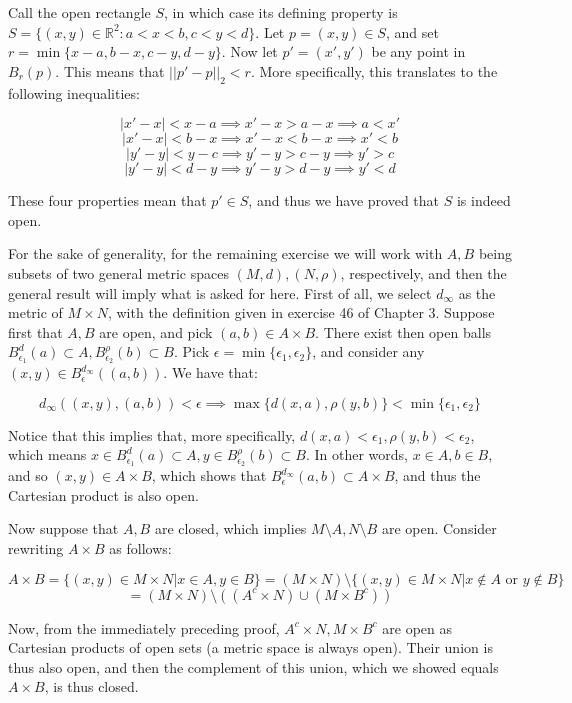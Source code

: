\begin{solution}
    
    Call the open rectangle $S$, in which case its defining property is $S = \{(x, y) \in \mathbb{R}^2 : a < x < b, c < y < d\}$.
    Let $p = (x, y) \in S$, and set $r = \min\{x - a, b - x, c - y, d - y\}$.
    Now let $p' = (x', y')$ be any point in $B_r(p)$.
    This means that $\lvert \lvert p' - p \rvert \rvert_2 < r$.
    More specifically, this translates to the following inequalities:

    $$\lvert x' - x \rvert < x - a \implies x' - x > a - x \implies a < x'$$
    $$\lvert x' - x \rvert < b - x \implies x' - x < b - x \implies x' < b$$    
    $$\lvert y' - y \rvert < y - c \implies y' - y > c - y \implies y' > c$$
    $$\lvert y' - y \rvert < d - y \implies y' - y > d - y \implies y' < d$$

    These four properties mean that $p' \in S$, and thus we have proved that $S$ is indeed open.

    For the sake of generality, for the remaining exercise we will work with $A, B$ being subsets of two general metric spaces $(M, d), (N, \rho)$, respectively, and then the general result will imply what is asked for here.
    First of all, we select $d_{\infty}$ as the metric of $M \times N$, with the definition given in exercise 46 of Chapter 3.
    Suppose first that $A, B$ are open, and pick $(a, b) \in A \times B$.
    There exist then open balls $B_{\epsilon_1}^{d}(a) \subset A, B_{\epsilon_2}^{\rho}(b) \subset B$.
    Pick $\epsilon = \min\{\epsilon_1, \epsilon_2\}$, and consider any $(x, y) \in B_{\epsilon}^{d_{\infty}}((a, b))$.
    We have that:
    
    $$d_{\infty}((x, y), (a, b)) < \epsilon \implies \max\{d(x, a), \rho(y, b)\} < \min\{\epsilon_1, \epsilon_2\}$$

    Notice that this implies that, more specifically, $d(x, a) < \epsilon_1, \rho(y, b) < \epsilon_2$, which means $x \in B_{\epsilon_1}^{d}(a) \subset A, y \in B_{\epsilon_2}^{\rho}(b) \subset B$.
    In other words, $x \in A, b \in B$, and so $(x, y) \in A \times B$, which shows that $B_{\epsilon}^{d_{\infty}}(a, b) \subset A \times B$, and thus the Cartesian product is also open.

    Now suppose that $A, B$ are closed, which implies $M \setminus A, N \setminus B$ are open.
    Consider rewriting $A \times B$ as follows:

    $$A \times B = \{(x, y) \in M \times N \lvert x \in A, y \in B\} = (M \times N) \setminus \{(x, y) \in M \times N \lvert x \notin A \text{ or } y \notin B\}$$
    $$ = (M \times N) \setminus ((A^{c} \times N) \cup (M \times B^{c}))$$

    Now, from the immediately preceding proof, $A^{c} \times N, M \times B^{c}$ are open as Cartesian products of open sets (a metric space is always open).
    Their union is thus also open, and then the complement of this union, which we showed equals $A \times B$, is thus closed.
\end{solution}

